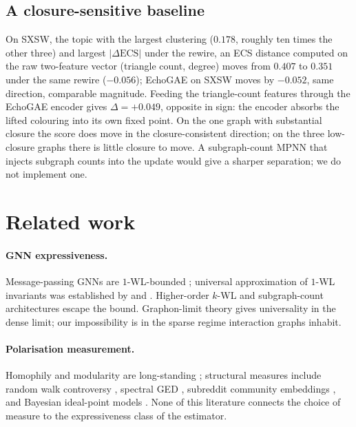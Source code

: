 \documentclass[letterpaper]{article} %
\begin{document}
\subsection{A closure-sensitive baseline}\label{sec:gsn}

On SXSW, the topic with the largest clustering
($0.178$, roughly ten times the other three) and largest
$|\Delta\mathrm{ECS}|$ under the rewire, an ECS distance
computed on the raw two-feature vector (triangle count,
degree) moves from $0.407$ to $0.351$ under the same rewire
($-0.056$); EchoGAE on SXSW moves by $-0.052$, same direction,
comparable magnitude. Feeding the triangle-count features
through the EchoGAE encoder gives $\Delta = +0.049$, opposite
in sign: the encoder absorbs the lifted colouring into its own
fixed point. On the one graph with substantial closure the
score does move in the closure-consistent direction; on the
three low-closure graphs there is little closure to move. A
subgraph-count MPNN \citep{Bouritsas2022} that injects
subgraph counts into the update would give a sharper
separation; we do not implement one.

\section{Related work}\label{sec:related}

\paragraph{GNN expressiveness.} Message-passing GNNs
\citep{GilmerNeuralMessagePassing2017} are $1$-WL-bounded
\citep{MorrisWL2019, XuGIN2019}; universal approximation of
$1$-WL invariants was established by \citet{ChenVillar2019}
and \citet{AzizianLelarge2021}. Higher-order $k$-WL and
subgraph-count architectures \citep{Bouritsas2022} escape
the bound. Graphon-limit theory \citep{KerivenPeyre2020,
RuizChamonRibeiro2021} gives universality in the dense
limit; our impossibility is in the sparse regime interaction
graphs inhabit.

\paragraph{Polarisation measurement.} Homophily and
modularity are long-standing \citep{Newman2003, Newman2004,
AdamicGlance2005, ConoverPolBlogs2011}; structural measures
include random walk controversy \citep{Garimella18},
spectral GED \citep{Hohmann2016, HohmannGED2023}, subreddit
community embeddings \citep{WallerAnderson2021}, and
Bayesian ideal-point models \citep{Barbera2015}. None of
this literature connects the choice of measure to the
expressiveness class of the estimator.
\end{document}
